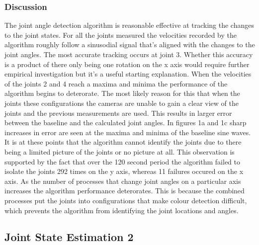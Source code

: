 \documentclass[./writeup.tex]{subfiles}
\begin{document}
\subsubsection{Discussion}
The joint angle detection algorithm is reasonable effective at tracking the changes to the joint states. For all the joints measured the velocities recorded by the algorithm roughly follow a sinusodial signal that's aligned with the changes to the joint angles.
\newline
\newline
The most accurate tracking occurs at joint 3. Whether this accuracy is a product of there only being one rotation on the x axis would require further empirical investigation but it's a useful starting explanation.
\newline
\newline
When the velocities of the joints 2 and 4 reach a maxima and minima the performance of the algorithm begins to deterorate. The most likely reason for this that when the joints these configurations the cameras are unable to gain a clear view of the joints and the previous measurements are used. This results in larger error between the baseline and the calculated joint angles. In figures 1a and 1c sharp increases in error are seen at the maxima and minima of the baseline sine waves. It is at these points that the algorithm cannot identify the joints due to there being a limited picture of the joints or no picture at all. This observation is supported by the fact that over the 120 second period the algorithm failed to isolate the joints 292 times on the y axis, whereas 11 failures occured on the x axis.
\newline
\newline
As the number of processes that change joint angles on a particular axis increases the algorithm performance deterorates. This is because the combined processes put the joints into configurations that make colour detection difficult, which prevents the algorithm from identifying the joint locations and angles.
\subsection{Joint State Estimation 2}
\end{document}
